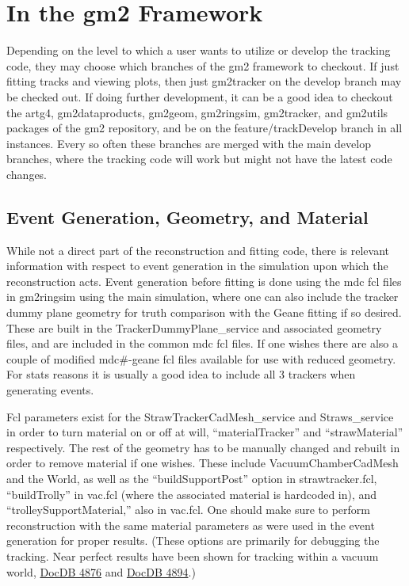 \section{In the gm2 Framework}
\label{sec:Framework}

  Depending on the level to which a user wants to utilize or develop the tracking code, they may choose which branches of the gm2 framework to checkout. If just fitting tracks and viewing plots, then just gm2tracker on the develop branch may be checked out. If doing further development, it can be a good idea to checkout the artg4, gm2dataproducts, gm2geom, gm2ringsim, gm2tracker, and gm2utils packages of the gm2 repository, and be on the feature/trackDevelop branch in all instances. Every so often these branches are merged with the main develop branches, where the tracking code will work but might not have the latest code changes. 

  \subsection{Event Generation, Geometry, and Material}

    While not a direct part of the reconstruction and fitting code, there is relevant information with respect to event generation in the simulation upon which the reconstruction acts. Event generation before fitting is done using the mdc fcl files in gm2ringsim using the main simulation, where one can also include the tracker dummy plane geometry for truth comparison with the Geane fitting if so desired. These are built in the TrackerDummyPlane\_service and associated geometry files, and are included in the common mdc fcl files. If one wishes there are also a couple of modified mdc\#-geane fcl files available for use with reduced geometry. For stats reasons it is usually a good idea to include all 3 trackers when generating events.

    Fcl parameters exist for the StrawTrackerCadMesh\_service and Straws\_service in order to turn material on or off at will, ``materialTracker'' and ``strawMaterial'' respectively. The rest of the geometry has to be manually changed and rebuilt in order to remove material if one wishes. These include VacuumChamberCadMesh and the World, as well as the ``buildSupportPost'' option in strawtracker.fcl, ``buildTrolly'' in vac.fcl (where the associated material is hardcoded in), and ``trolleySupportMaterial,'' also in vac.fcl. One should make sure to perform reconstruction with the same material parameters as were used in the event generation for proper results. (These options are primarily for debugging the tracking. Near perfect results have been shown for tracking within a vacuum world, \href{http://gm2-docdb.fnal.gov:8080/cgi-bin/ShowDocument?docid=4876}{DocDB 4876} and \href{http://gm2-docdb.fnal.gov:8080/cgi-bin/ShowDocument?docid=4894}{DocDB 4894}.)


